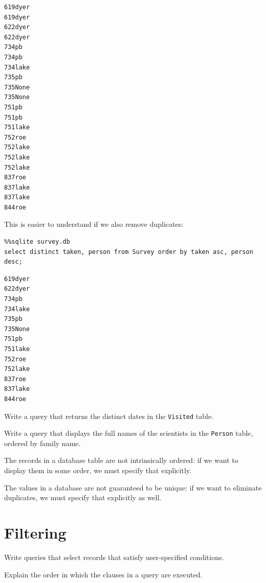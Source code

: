 \documentclass{book}
\begin{document}
\begin{verbatim}
619dyer
619dyer
622dyer
622dyer
734pb
734pb
734lake
735pb
735None
735None
751pb
751pb
751lake
752roe
752lake
752lake
752lake
837roe
837lake
837lake
844roe
\end{verbatim}

This is easier to understand if we also remove duplicates:

\begin{verbatim}
%%sqlite survey.db
select distinct taken, person from Survey order by taken asc, person desc;
\end{verbatim}

\begin{verbatim}
619dyer
622dyer
734pb
734lake
735pb
735None
751pb
751lake
752roe
752lake
837roe
837lake
844roe
\end{verbatim}

\begin{challenge}
  Write a query that returns the distinct dates in the \texttt{Visited}
  table.
\end{challenge}

\begin{challenge}
  Write a query that displays the full names of the scientists in the
  \texttt{Person} table, ordered by family name.
\end{challenge}

\begin{keypoints}
\begin{swcitemize}
\item
  The records in a database table are not intrinsically ordered: if we
  want to display them in some order, we must specify that explicitly.
\item
  The values in a database are not guaranteed to be unique: if we want
  to eliminate duplicates, we must specify that explicitly as well.
\end{swcitemize}
\end{keypoints}

\section{Filtering}

\begin{objectives}
\begin{swcitemize}
\item
  Write queries that select records that satisfy user-specified
  conditions.
\item
  Explain the order in which the clauses in a query are executed.
\end{swcitemize}
\end{objectives}
\end{document}
